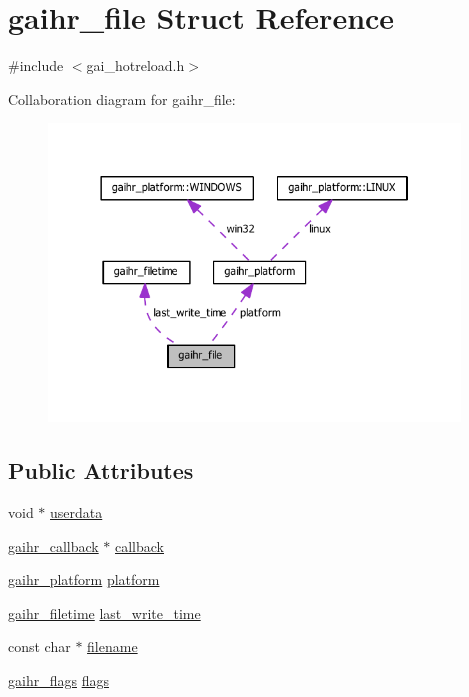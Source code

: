 \hypertarget{structgaihr__file}{}\section{gaihr\+\_\+file Struct Reference}
\label{structgaihr__file}


{\ttfamily \#include $<$gai\+\_\+hotreload.\+h$>$}



Collaboration diagram for gaihr\+\_\+file\+:
\nopagebreak
\begin{figure}[H]
\begin{center}
\leavevmode
\includegraphics[width=310pt]{structgaihr__file__coll__graph}
\end{center}
\end{figure}
\subsection*{Public Attributes}
\begin{DoxyCompactItemize}
\item 
void $\ast$ \hyperlink{structgaihr__file_a06bf963cb9c08e69fcc6c4bb3140a2b8}{userdata}
\item 
\hyperlink{gai__hotreload_8h_a8026f464cf8636b763b6f03798d40800}{gaihr\+\_\+callback} $\ast$ \hyperlink{structgaihr__file_a9ac45c0142ff1eaf591b870e163d7f31}{callback}
\item 
\hyperlink{uniongaihr__platform}{gaihr\+\_\+platform} \hyperlink{structgaihr__file_a138044c270d5f0e83917ae2841efe8b7}{platform}
\item 
\hyperlink{uniongaihr__filetime}{gaihr\+\_\+filetime} \hyperlink{structgaihr__file_a38b2bc43116a1fd59715ca1714d80462}{last\+\_\+write\+\_\+time}
\item 
const char $\ast$ \hyperlink{structgaihr__file_a26ea2bbf62231c3cae2317ca217f8166}{filename}
\item 
\hyperlink{gai__hotreload_8h_aaebb069b6896f065efd75640e0e4150b}{gaihr\+\_\+flags} \hyperlink{structgaihr__file_ab6eef82d50a8a51d161de3ab7ad98ee9}{flags}
\end{DoxyCompactItemize}


